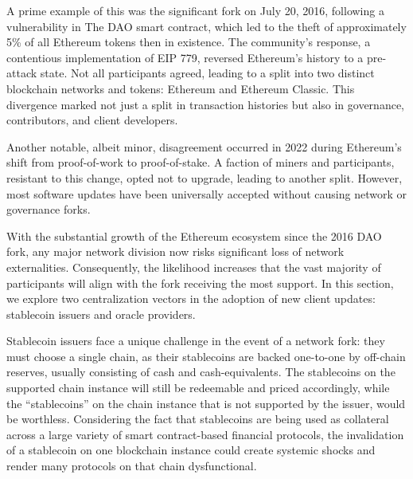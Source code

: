 \documentclass[No]{AEA}
\begin{document}
A prime example of this was the significant fork on July 20, 2016, following a vulnerability in The DAO smart contract, which led to the theft of approximately 5\% of all Ethereum tokens then in existence. The community's response, a contentious implementation of EIP 779, reversed Ethereum's history to a pre-attack state. Not all participants agreed, leading to a split into two distinct blockchain networks and tokens: Ethereum and Ethereum Classic. This divergence marked not just a split in transaction histories but also in governance, contributors, and client developers.

Another notable, albeit minor, disagreement occurred in 2022 during Ethereum's shift from proof-of-work to proof-of-stake. A faction of miners and participants, resistant to this change, opted not to upgrade, leading to another split. However, most software updates have been universally accepted without causing network or governance forks.

With the substantial growth of the Ethereum ecosystem since the 2016 DAO fork, any major network division now risks significant loss of network externalities. Consequently, the likelihood increases that the vast majority of participants will align with the fork receiving the most support. In this section, we explore two centralization vectors in the adoption of new client updates: stablecoin issuers and oracle providers.


Stablecoin issuers face a unique challenge in the event of a network fork: they must choose a single chain, as their stablecoins are backed one-to-one by off-chain reserves, usually consisting of cash and cash-equivalents. The stablecoins on the supported chain instance will still be redeemable and priced accordingly, while the ``stablecoins'' on the chain instance that is not supported by the issuer, would be worthless. Considering the fact that stablecoins are being used as collateral across a large variety of smart contract-based financial protocols, the invalidation of a stablecoin on one blockchain instance could create systemic shocks and render many protocols on that chain dysfunctional. 
\end{document}
